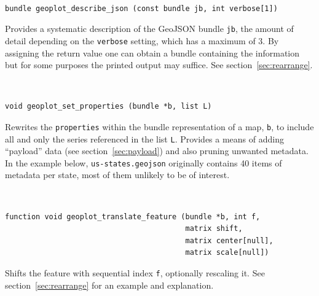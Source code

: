 \documentclass{article}
\newenvironment{funcdoc}
{\noindent\hrulefill\\[-10pt]}
{\medskip}
\begin{document}
\begin{funcdoc}
\begin{verbatim}
bundle geoplot_describe_json (const bundle jb, int verbose[1])
\end{verbatim}
  Provides a systematic description of the GeoJSON bundle \texttt{jb},
  the amount of detail depending on the \texttt{verbose} setting,
  which has a maximum of 3. By assigning the return value one can
  obtain a bundle containing the information but for some purposes the
  printed output may suffice. See section~\ref{sec:rearrange}.
\end{funcdoc}

\begin{funcdoc}
\begin{verbatim}
void geoplot_set_properties (bundle *b, list L)
\end{verbatim}
  Rewrites the \texttt{properties} within the bundle representation of
  a map, \texttt{b}, to include all and only the series referenced in
  the list \texttt{L}. Provides a means of adding ``payload'' data
  (see section~\ref{sec:payload}) and also pruning unwanted metadata.
  In the example below, \texttt{us-states.geojson} originally contains
  40 items of metadata per state, most of them unlikely to be of
  interest.
\end{funcdoc}

\begin{funcdoc}
\begin{verbatim}
function void geoplot_translate_feature (bundle *b, int f,
                                         matrix shift,
                                         matrix center[null],
                                         matrix scale[null])
\end{verbatim}
  Shifts the feature with sequential index \texttt{f}, optionally
  rescaling it. See section~\ref{sec:rearrange} for an example and
  explanation.
\end{funcdoc}
\end{document}

